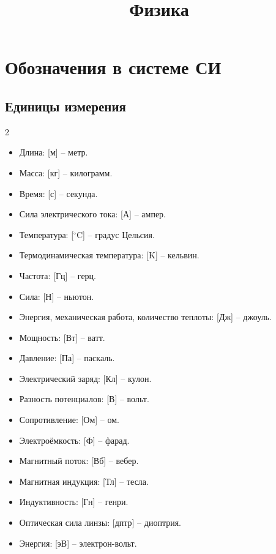 \documentclass[12pt]{article}
\title{\textbf{Физика}}\date{}\author{}
\begin{document}
\maketitle
\tableofcontents
\label{toc}
\newpage

\section{Обозначения в системе СИ}

\setlength{\columnsep}{1.5cm}

\subsection{Единицы измерения}

\begin{center}
    \begin{multicols}{2}
        \begin{itemize}[leftmargin=*, itemsep=0pt]
            \item Длина: [м] -- метр.
            \item Масса: [кг] -- килограмм.
            \item Время: [с] -- секунда.
            \item Сила электрического тока: [А] -- ампер.
            \item Температура: [$^\circ$C] -- градус Цельсия.
            \item Термодинамическая температура: [K] -- кельвин.
            \item Частота: [Гц] -- герц.
            \item Сила: [Н] -- ньютон.
            \item Энергия, механическая работа, количество теплоты: [Дж] -- джоуль.
            \item Мощность: [Вт] -- ватт.
            \item Давление: [Па] -- паскаль.
            \item Электрический заряд: [Кл] -- кулон.
            \item Разность потенциалов: [В] -- вольт.
            \item Сопротивление: [Ом] -- ом.
            \item Электроёмкость: [Ф] -- фарад.
            \item Магнитный поток: [Вб] -- вебер.
            \item Магнитная индукция: [Тл] -- тесла.
            \item Индуктивность: [Гн] -- генри.
            \item Оптическая сила линзы: [дптр] -- диоптрия.
            \item Энергия: [эВ] -- электрон-вольт.
        \end{itemize}
    \end{multicols}
\end{center}
\end{document}
